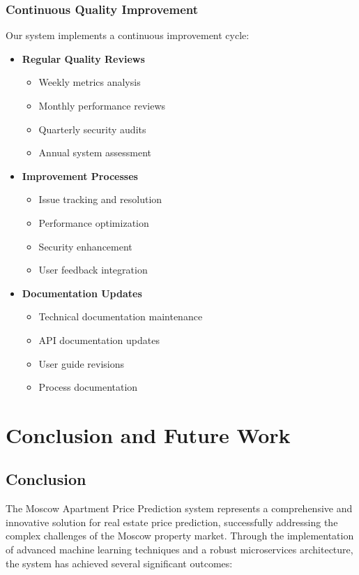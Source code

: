\documentclass[12pt,a4paper]{report}
\begin{document}
\subsection{Continuous Quality Improvement}
Our system implements a continuous improvement cycle:
\begin{itemize}
    \item \textbf{Regular Quality Reviews}
    \begin{itemize}
        \item Weekly metrics analysis
        \item Monthly performance reviews
        \item Quarterly security audits
        \item Annual system assessment
    \end{itemize}
    
    \item \textbf{Improvement Processes}
    \begin{itemize}
        \item Issue tracking and resolution
        \item Performance optimization
        \item Security enhancement
        \item User feedback integration
    \end{itemize}
    
    \item \textbf{Documentation Updates}
    \begin{itemize}
        \item Technical documentation maintenance
        \item API documentation updates
        \item User guide revisions
        \item Process documentation
    \end{itemize}
\end{itemize}

\chapter{Conclusion and Future Work}
\section{Conclusion}
The Moscow Apartment Price Prediction system represents a comprehensive and innovative solution for real estate price prediction, successfully addressing the complex challenges of the Moscow property market. Through the implementation of advanced machine learning techniques and a robust microservices architecture, the system has achieved several significant outcomes:
\end{document}

